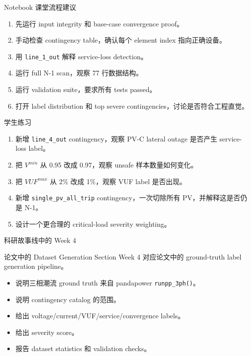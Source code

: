 \documentclass[aspectratio=169,11pt]{beamer}
\begin{document}
\begin{frame}{Notebook 课堂流程建议}
\begin{enumerate}
  \item 先运行 input integrity 和 base-case convergence proof。
  \item 手动检查 contingency table，确认每个 element index 指向正确设备。
  \item 用 \texttt{line\_1\_out} 解释 service-loss detection。
  \item 运行 full N-1 scan，观察 77 行数据结构。
  \item 运行 validation suite，要求所有 tests passed。
  \item 打开 label distribution 和 top severe contingencies，讨论是否符合工程直觉。
\end{enumerate}
\end{frame}

\begin{frame}{学生练习}
\begin{enumerate}
  \item 新增 \texttt{line\_4\_out} contingency，观察 PV-C lateral outage 是否产生 service-loss label。
  \item 把 $V^{min}$ 从 0.95 改成 0.97，观察 unsafe 样本数量如何变化。
  \item 把 $VUF^{max}$ 从 2\% 改成 1\%，观察 VUF label 是否出现。
  \item 新增 \texttt{single\_pv\_all\_trip} contingency，一次切除所有 PV，并解释这是否仍是 N-1。
  \item 设计一个更合理的 critical-load severity weighting。
\end{enumerate}
\end{frame}

\begin{frame}{科研故事线中的 Week 4}
\begin{block}{论文中的 Dataset Generation Section}
Week 4 对应论文中的 ground-truth label generation pipeline。
\end{block}
\begin{itemize}
  \item 说明三相潮流 ground truth 来自 pandapower \texttt{runpp\_3ph()}。
  \item 说明 contingency catalog 的范围。
  \item 给出 voltage/current/VUF/service/convergence labels。
  \item 给出 severity score。
  \item 报告 dataset statistics 和 validation checks。
\end{itemize}
\end{frame}
\end{document}
